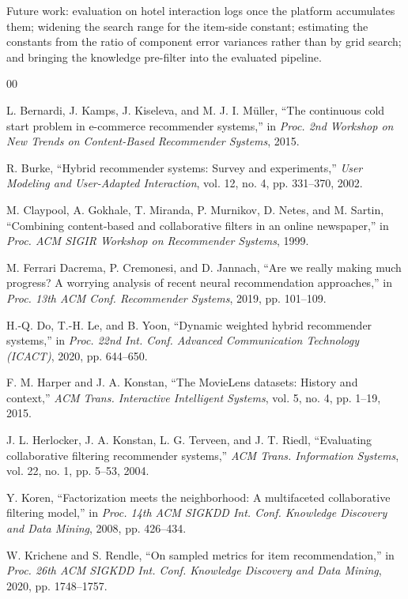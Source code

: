 \documentclass[conference]{IEEEtran}
\begin{document}
Future work: evaluation on hotel interaction logs once the platform
accumulates them; widening the search range for the item-side
constant; estimating the constants from the ratio of component error
variances rather than by grid search; and bringing the knowledge
pre-filter into the evaluated pipeline.

\begin{thebibliography}{00}

 L. Bernardi, J. Kamps, J. Kiseleva, and
M. J. I. Müller, ``The continuous cold start problem in e-commerce
recommender systems,'' in \textit{Proc. 2nd Workshop on New Trends
on Content-Based Recommender Systems}, 2015.

 R. Burke, ``Hybrid recommender systems: Survey
and experiments,'' \textit{User Modeling and User-Adapted
Interaction}, vol. 12, no. 4, pp. 331--370, 2002.

 M. Claypool, A. Gokhale, T. Miranda,
P. Murnikov, D. Netes, and M. Sartin, ``Combining content-based and
collaborative filters in an online newspaper,'' in \textit{Proc. ACM
SIGIR Workshop on Recommender Systems}, 1999.

 M. Ferrari Dacrema, P. Cremonesi, and
D. Jannach, ``Are we really making much progress? A worrying analysis
of recent neural recommendation approaches,'' in \textit{Proc. 13th
ACM Conf. Recommender Systems}, 2019, pp. 101--109.

 H.-Q. Do, T.-H. Le, and B. Yoon, ``Dynamic weighted
hybrid recommender systems,'' in \textit{Proc. 22nd Int. Conf.
Advanced Communication Technology (ICACT)}, 2020, pp. 644--650.

 F. M. Harper and J. A. Konstan, ``The MovieLens
datasets: History and context,'' \textit{ACM Trans. Interactive
Intelligent Systems}, vol. 5, no. 4, pp. 1--19, 2015.

 J. L. Herlocker, J. A. Konstan,
L. G. Terveen, and J. T. Riedl, ``Evaluating collaborative filtering
recommender systems,'' \textit{ACM Trans. Information Systems},
vol. 22, no. 1, pp. 5--53, 2004.

 Y. Koren, ``Factorization meets the
neighborhood: A multifaceted collaborative filtering model,'' in
\textit{Proc. 14th ACM SIGKDD Int. Conf. Knowledge Discovery and Data
Mining}, 2008, pp. 426--434.

 W. Krichene and S. Rendle, ``On sampled
metrics for item recommendation,'' in \textit{Proc. 26th ACM SIGKDD
Int. Conf. Knowledge Discovery and Data Mining}, 2020,
pp. 1748--1757.


\end{thebibliography}
\end{document}
